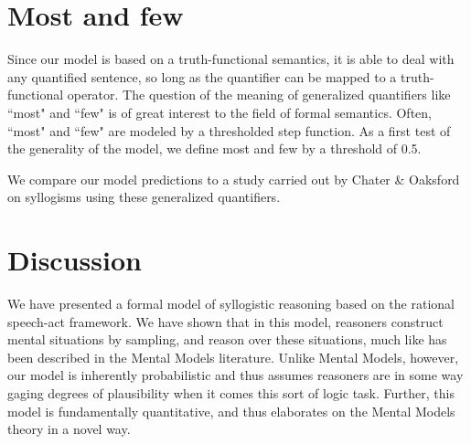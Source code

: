 \documentclass[10pt,letterpaper]{article}
\begin{document}
%
%





\section{Most and few}

Since our model is based on a truth-functional semantics, it is able to deal with any quantified sentence, so long as the quantifier can be mapped to a truth-functional operator. The question of the meaning of generalized quantifiers like ``most" and ``few" is of great interest to the field of formal semantics. Often, ``most" and ``few" are modeled by a thresholded step function. As a first test of the generality of the model, we define most and few by a threshold of 0.5. 

We compare our model predictions to a study carried out by Chater \& Oaksford on syllogisms using these generalized quantifiers. 

\section{Discussion}

We have presented a formal model of syllogistic reasoning based on the rational speech-act framework. We have shown that in this model, reasoners construct mental situations by sampling, and reason over these situations, much like has been described in the Mental Models literature. Unlike Mental Models, however, our model is inherently probabilistic and thus assumes reasoners are in some way gaging degrees of plausibility when it comes this sort of logic task. Further, this model is fundamentally quantitative, and thus elaborates on the Mental Models theory in a novel way.
\end{document}
